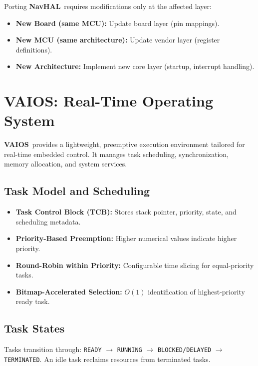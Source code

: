 \documentclass[11pt]{article}
\newcommand{\navhal}{\textbf{NavHAL}}
\newcommand{\vaios}{\textbf{VAIOS}}
\begin{document}
Porting \navhal~requires modifications only at the affected layer:

\begin{itemize}[leftmargin=*]
    \item \textbf{New Board (same MCU):} Update board layer (pin mappings).
    \item \textbf{New MCU (same architecture):} Update vendor layer (register definitions).
    \item \textbf{New Architecture:} Implement new core layer (startup, interrupt handling).
\end{itemize}

\section{VAIOS: Real-Time Operating System}

\vaios~provides a lightweight, preemptive execution environment tailored for real-time embedded control. It manages task scheduling, synchronization, memory allocation, and system services.

\subsection{Task Model and Scheduling}

\begin{itemize}[leftmargin=*]
    \item \textbf{Task Control Block (TCB):} Stores stack pointer, priority, state, and scheduling metadata.
    \item \textbf{Priority-Based Preemption:} Higher numerical values indicate higher priority.
    \item \textbf{Round-Robin within Priority:} Configurable time slicing for equal-priority tasks.
    \item \textbf{Bitmap-Accelerated Selection:} $O(1)$ identification of highest-priority ready task.
\end{itemize}

\subsection{Task States}

Tasks transition through: \texttt{READY} $\rightarrow$ \texttt{RUNNING} $\rightarrow$ \texttt{BLOCKED/DELAYED} $\rightarrow$ \texttt{TERMINATED}. An idle task reclaims resources from terminated tasks.
\end{document}
